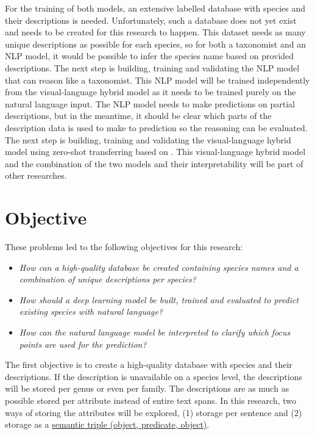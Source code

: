 \documentclass[a4paper, 12pt, oneside]{book} %
\begin{document}
For the training of both models, an extensive labelled database with species and their descriptions is needed. 
Unfortunately, such a database does not yet exist and needs to be created for this research to happen.
This dataset needs as many unique descriptions as possible for each species, so for both a taxonomist and an NLP model, it would be possible to infer the species name based on provided descriptions.
The next step is building, training and validating the NLP model that can reason like a taxonomist.
This NLP model will be trained independently from the visual-language hybrid model as it needs to be trained purely on the natural language input. 
The NLP model needs to make predictions on partial descriptions, but in the meantime, it should be clear which parts of the description data is used to make to prediction so the reasoning can be evaluated.
The next step is building, training and validating the visual-language hybrid model using zero-shot transferring based on \textcite{radford_learning_2021}.
This visual-language hybrid model and the combination of the two models and their interpretability will be part of other researches.

\section{Objective}
These problems led to the following objectives for this research:
\noindent 
\begin{itemize}
    
    \item \emph{How can a high-quality database be created containing species names and a combination of unique descriptions per species?}
    
    \item \emph{How should a deep learning model be built, trained and evaluated to predict existing species with natural language?}

    \item \emph{How can the natural language model be interpreted to clarify which focus points are used for the prediction?}

\end{itemize}

The first objective is to create a high-quality database with species and their descriptions.
If the description is unavailable on a species level, the descriptions will be stored per genus or even per family.
The descriptions are as much as possible stored per attribute instead of entire text spans.
In this research, two ways of storing the attributes will be explored, (1) storage per sentence and (2) storage as a \href{https://www.ontotext.com/knowledgehub/fundamentals/what-is-a-knowledge-graph/}{semantic triple (object, predicate, object)}.
\end{document}
